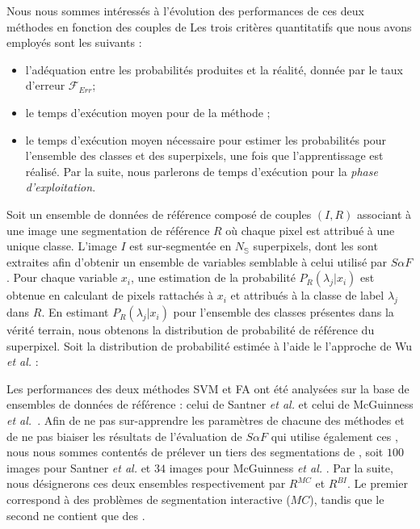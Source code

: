  Nous nous sommes intéressés à l'évolution des performances de ces deux méthodes en fonction des couples de  Les trois critères quantitatifs que nous avons employés sont les suivants :
\begin{itemize}
\item l'adéquation entre les probabilités produites et la réalité, donnée par le taux d'erreur $\mathcal{F}_{Err}$;
\item le temps d'exécution moyen pour  de la méthode ;
\item le temps d'exécution moyen nécessaire pour estimer les probabilités pour l'ensemble des classes et des superpixels, une fois que l'apprentissage est réalisé. Par la suite, nous parlerons de temps d'exécution pour la \emph{phase d'exploitation}.
\end{itemize}

Soit un ensemble de données de référence composé de couples $(I,R)$ associant à une image une segmentation de référence $R$ où chaque pixel est attribué à une unique classe. L'image $I$ est sur-segmentée en $N_{\mathbb{S}}$ superpixels, dont les  sont extraites afin d'obtenir un ensemble de variables  semblable à celui utilisé par $S \alpha F$. Pour chaque variable $x_{i}$, une estimation de la probabilité $P_{R}(\lambda_{j} | x_{i})$ est obtenue en calculant  de pixels rattachés à $x_{i}$ et attribués à la classe de label $\lambda_{j}$ dans $R$. En estimant $P_{R}(\lambda_{j} | x_{i})$ pour l'ensemble des classes présentes dans la vérité terrain, nous obtenons  la distribution de probabilité de référence du superpixel. Soit  la distribution de probabilité estimée à l'aide le l'approche de Wu \textit{et al.} \cite{wu2004probability} : 

Les performances des deux méthodes\modif{,} SVM et FA\modif{,} ont été analysées sur la base de  ensembles de données de référence : celui de Santner \textit{et al.} \cite{santner2010interactive} et celui de McGuinness \textit{et al.}~\cite{mcguinness2010comparative}. Afin de ne pas sur-apprendre les paramètres de chacune des méthodes et de ne pas biaiser les résultats de l'évaluation de $S \alpha F$ qui utilise également ces , nous nous sommes contentés de prélever un tiers des segmentations de , soit $100$ images pour Santner \textit{et al.} \cite{santner2010interactive}  et $34$ images pour McGuinness \textit{et al.} \cite{mcguinness2010comparative}. Par la suite, nous désignerons ces deux ensembles respectivement par $R^{ MC}$ et $R^{ BI}$. Le premier correspond à des problèmes de segmentation interactive  ($MC$), tandis que le second ne contient que des .

